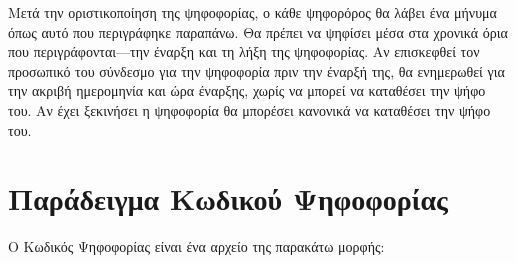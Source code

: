 \documentclass{tufte-handout}
\begin{document}
Μετά την οριστικοποίηση της ψηφοφορίας, ο κάθε ψηφορόρος θα λάβει ένα
μήνυμα όπως αυτό που περιγράφηκε παραπάνω. Θα πρέπει να ψηφίσει μέσα
στα χρονικά όρια που περιγράφονται---την έναρξη και τη λήξη της
ψηφοφορίας. Αν επισκεφθεί τον προσωπικό του σύνδεσμο για την ψηφοφορία
πριν την έναρξή της, θα ενημερωθεί για την ακριβή ημερομηνία και ώρα
έναρξης, χωρίς να μπορεί να καταθέσει την ψήφο του. Αν έχει ξεκινήσει
η ψηφοφορία θα μπορέσει κανονικά να καταθέσει την ψήφο του.

\section{Παράδειγμα Κωδικού Ψηφοφορίας}
\label{sec:electoral-committee-key}

Ο Κωδικός Ψηφοφορίας είναι ένα αρχείο της παρακάτω μορφής:
\end{document}
